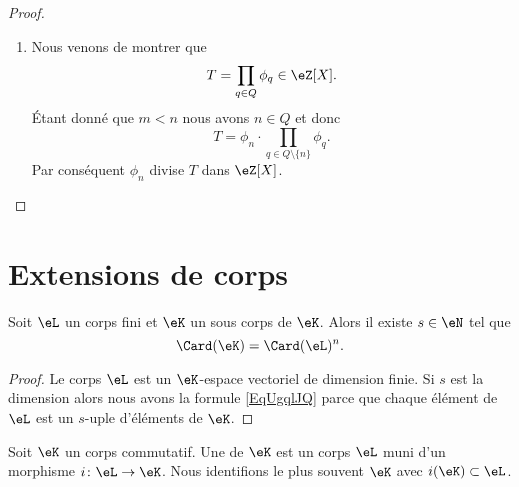 \begin{proof}
\begin{enumerate}
        \item

            Nous venons de montrer que
            \begin{equation}
                T=\prod_{q\in Q}\phi_q\in \eZ[X].
            \end{equation}
            Étant donné que \( m<n\) nous avons \( n\in Q\) et donc
            \begin{equation}
                T=\phi_n\cdot\prod_{q\in Q\setminus\{ n \}}\phi_q.
            \end{equation}
            Par conséquent \( \phi_n\) divise \( T\) dans \( \eZ[X]\).

        \end{enumerate}

\end{proof}

\section{Extensions de corps}

\begin{lemma}       \label{LemobATFP}
    Soit \( \eL\) un corps fini et \( \eK\) un sous corps de \( \eK\). Alors il existe \( s\in \eN\) tel que
    \begin{equation}        \label{EqUgqlJQ}
        \Card(\eK)=\Card(\eL)^n.
    \end{equation}
\end{lemma}

\begin{proof}
    Le corps \( \eL\) est un \( \eK\)-espace vectoriel de dimension finie. Si \( s\) est la dimension alors nous avons la formule \eqref{EqUgqlJQ} parce que chaque élément de \( \eL\) est un \( s\)-uple d'éléments de \( \eK\).
\end{proof}

\begin{definition}
    Soit \( \eK\) un corps commutatif. Une  de \( \eK\) est un corps \( \eL\) muni d'un morphisme \( i\colon \eL\to \eK\). Nous identifions le plus souvent \( \eK\) avec \( i(\eK)\subset \eL\).
\end{definition}

